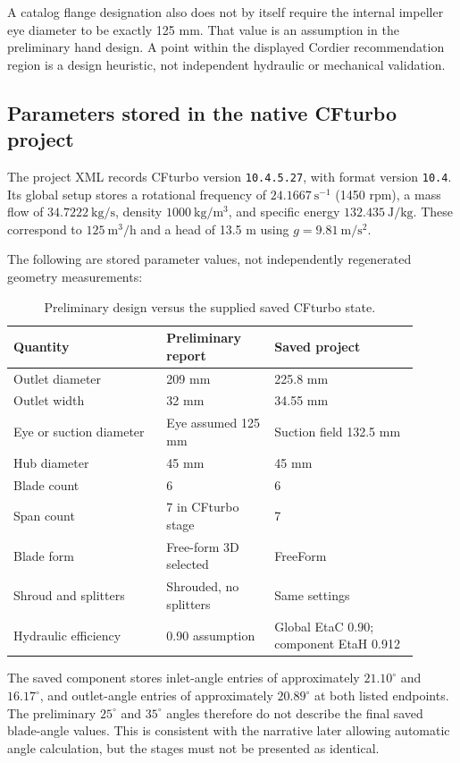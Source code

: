 \documentclass[11pt,a4paper]{article}
\begin{document}
A catalog flange designation also does not by itself require the internal impeller eye diameter to be exactly 125 mm. That value is an assumption in the preliminary hand design. A point within the displayed Cordier recommendation region is a design heuristic, not independent hydraulic or mechanical validation.

\subsection{Parameters stored in the native CFturbo project}
The project XML records CFturbo version \texttt{10.4.5.27}, with format version \texttt{10.4}. Its global setup stores a rotational frequency of $24.1667\ \mathrm{s^{-1}}$ (1450 rpm), a mass flow of $34.7222\ \mathrm{kg/s}$, density $1000\ \mathrm{kg/m^3}$, and specific energy $132.435\ \mathrm{J/kg}$. These correspond to $125\ \mathrm{m^3/h}$ and a head of 13.5 m using $g=9.81\ \mathrm{m/s^2}$.

The following are stored parameter values, not independently regenerated geometry measurements:
\begin{table}[H]\centering\small
\caption{Preliminary design versus the supplied saved CFturbo state.}
\begin{tabular}{p{0.34\linewidth}p{0.24\linewidth}p{0.32\linewidth}}\toprule
Quantity & Preliminary report & Saved project\\\midrule
Outlet diameter & 209 mm & 225.8 mm\\
Outlet width & 32 mm & 34.55 mm\\
Eye or suction diameter & Eye assumed 125 mm & Suction field 132.5 mm\\
Hub diameter & 45 mm & 45 mm\\
Blade count & 6 & 6\\
Span count & 7 in CFturbo stage & 7\\
Blade form & Free-form 3D selected & FreeForm\\
Shroud and splitters & Shrouded, no splitters & Same settings\\
Hydraulic efficiency & 0.90 assumption & Global EtaC 0.90; component EtaH 0.912\\\bottomrule
\end{tabular}\end{table}
The saved component stores inlet-angle entries of approximately $21.10^\circ$ and $16.17^\circ$, and outlet-angle entries of approximately $20.89^\circ$ at both listed endpoints. The preliminary $25^\circ$ and $35^\circ$ angles therefore do not describe the final saved blade-angle values. This is consistent with the narrative later allowing automatic angle calculation, but the stages must not be presented as identical.
\end{document}
